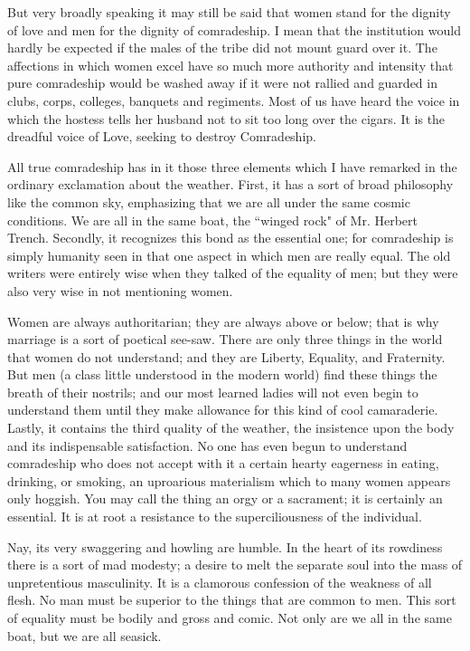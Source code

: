 \documentclass[final,10pt,letterpaper,twocolumn,openany]{book}
\begin{document}
But very broadly speaking it may still be said that
women stand for the dignity of love and men for the dignity of
comradeship. I mean that the institution would hardly be expected if the
males of the tribe did not mount guard over it. The affections in which
women excel have so much more authority and intensity that pure
comradeship would be washed away if it were not rallied and guarded in
clubs, corps, colleges, banquets and regiments. Most of us have heard the
voice in which the hostess tells her husband not to sit too long over the
cigars. It is the dreadful voice of Love, seeking to destroy Comradeship.

All true comradeship has in it those three elements which I have
remarked in the ordinary exclamation about the weather. First, it has a sort
of broad philosophy like the common sky, emphasizing that we are all
under the same cosmic conditions. We are all in the same boat, the
``winged rock" of Mr. Herbert Trench. Secondly, it recognizes this bond as
the essential one; for comradeship is simply humanity seen in that one
aspect in which men are really equal. The old writers were entirely wise
when they talked of the equality of men; but they were also very wise in
not mentioning women. 

Women are always authoritarian; they are always
above or below; that is why marriage is a sort of poetical see-saw. There
are only three things in the world that women do not understand; and they
are Liberty, Equality, and Fraternity. But men (a class little understood in
the modern world) find these things the breath of their nostrils; and our
most learned ladies will not even begin to understand them until they
make allowance for this kind of cool camaraderie. Lastly, it contains the
third quality of the weather, the insistence upon the body and its
indispensable satisfaction. No one has even begun to understand
comradeship who does not accept with it a certain hearty eagerness in
eating, drinking, or smoking, an uproarious materialism which to many
women appears only hoggish. You may call the thing an orgy or a
sacrament; it is certainly an essential. It is at root a resistance to the
superciliousness of the individual. 

Nay, its very swaggering and howling
are humble. In the heart of its rowdiness there is a sort of mad modesty; a
desire to melt the separate soul into the mass of unpretentious masculinity.
It is a clamorous confession of the weakness of all flesh. No man must be
superior to the things that are common to men. This sort of equality must
be bodily and gross and comic. Not only are we all in the same boat, but
we are all seasick.
\end{document}
